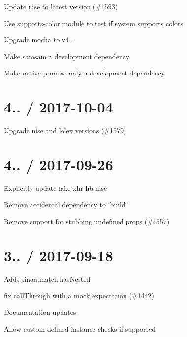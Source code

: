 \begin{DoxyItemize}
\item Update \textquotesingle{}nise\textquotesingle{} to latest version (\#1593)
\item Use supports-\/color module to test if system supports colors
\item Upgrade mocha to v4..
\item Make samsam a development dependency
\item Make native-\/promise-\/only a development dependency
\end{DoxyItemize}

\section*{4.. / 2017-\/10-\/04 }


\begin{DoxyItemize}
\item Upgrade nise and lolex versions (\#1579)
\end{DoxyItemize}

\section*{4.. / 2017-\/09-\/26 }


\begin{DoxyItemize}
\item Explicitly update fake xhr lib \textquotesingle{}nise\textquotesingle{}
\item Remove accidental dependency to \char`\"{}build\char`\"{}
\item Remove support for stubbing undefined props (\#1557)
\end{DoxyItemize}

\section*{3.. / 2017-\/09-\/18 }


\begin{DoxyItemize}
\item Adds sinon.\+match.\+has\+Nested
\item fix \textquotesingle{}call\+Through with a mock expectation\textquotesingle{} (\#1442)
\item Documentation updates
\item Allow custom defined instance checks if supported
\end{DoxyItemize}

